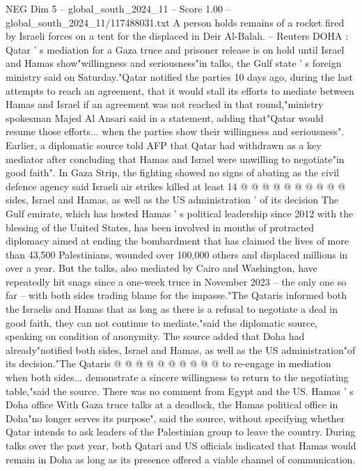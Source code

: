 \begin{textsample}{NEG Dim 5 – global\_south\_2024\_11 – Score 1.00 – global\_south\_2024\_11/117488031.txt}  \label{ex:f5_neg_430}
A person holds remains of a rocket fired by Israeli forces on a tent for the displaced in Deir Al-Balah. -- Reuters DOHA : Qatar ' s mediation for a Gaza truce and prisoner release is on hold until Israel and Hamas show"willingness and seriousness"in talks, the Gulf state ' s foreign ministry said on Saturday."Qatar notified the parties 10 days ago, during the last attempts to reach an agreement, that it would stall its efforts to mediate between Hamas and Israel if an agreement was not reached in that round,"ministry spokesman Majed Al Ansari said in a statement, adding that"Qatar would resume those efforts... when the parties show their willingness and seriousness".
Earlier, a diplomatic source told AFP that Qatar had withdrawn as a key mediator after concluding that Hamas and Israel were unwilling to negotiate"in good faith".
In Gaza Strip, the fighting showed no signs of abating as the civil defence agency said Israeli air strikes killed at least 14 @ @ @ @ @ @ @ @ @ @ sides, Israel and Hamas, as well as the US administration ' of its decision The Gulf emirate, which has hosted Hamas ' s political leadership since 2012 with the blessing of the United States, has been involved in months of protracted diplomacy aimed at ending the bombardment that has claimed the lives of more than 43,500 Palestinians, wounded over 100,000 others and displaced millions in over a year.
But the talks, also mediated by Cairo and Washington, have repeatedly hit snags since a one-week truce in November 2023 -- the only one so far -- with both sides trading blame for the impasse."The Qataris informed both the Israelis and Hamas that as long as there is a refusal to negotiate a deal in good faith, they can not continue to mediate,"said the diplomatic source, speaking on condition of anonymity.
The source added that Doha had already"notified both sides, Israel and Hamas, as well as the US administration"of its decision."The Qataris @ @ @ @ @ @ @ @ @ @ to re-engage in mediation when both sides... demonstrate a sincere willingness to return to the negotiating table,"said the source.
There was no comment from Egypt and the US.
Hamas ' s Doha office With Gaza truce talks at a deadlock, the Hamas political office in Doha"no longer serves its purpose", said the source, without specifying whether Qatar intends to ask leaders of the Palestinian group to leave the country.
During talks over the past year, both Qatari and US officials indicated that Hamas would remain in Doha as long as its presence offered a viable channel of communication.

\end{textsample}
